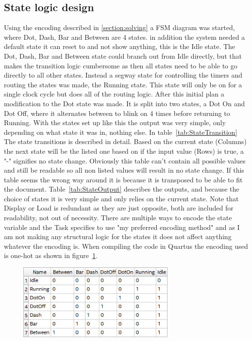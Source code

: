 \documentclass{article}
\begin{document}
\subsection{State logic design}\label{section:FSM}
 Using the encoding described in \ref{section:solving} a FSM diagram was started, where Dot, Dash, Bar and Between are 4 states. in addition the system needed a default state it can reset to and not show anything, this is the Idle state. The Dot, Dash, Bar and Between state could branch out from Idle directly, but that makes the transition logic cumbersome as then all states need to be able to go directly to all other states. Instead a segway state for controlling the timers and routing the states was made, the Running state. This state will only be on for a single clock cycle but does all of the routing logic. After this initial plan a modification to the Dot state was made. It is split into two states, a Dot On and Dot Off, where it alternates between to blink on 4 times before returning to Running. With the states set up like this the output was very simple, only depending on what state it was in, nothing else. In table~\ref{tab:StateTransition} The state transitions is described in detail. Based on the current state (Columns) the next state will be the listed one based on if the input value (Rows) is true, a "-" signifies no state change. Obviously this table can't contain all possible values and still be readable so all non listed values will result in no state change. If this table seems the wrong way around it is because it is transposed to be able to fit the document. Table~\ref{tab:StateOutput} describes the outputs, and because the choice of states it is very simple and only relies on the current state. Note that Display or Load is redundant as they are just opposite, both are included for readability, not out of necessity. There are multiple ways to encode the state variable and the Task specifies to use "my preferred encoding method" and as I am not making any structural logic for the states it does not affect anything whatever the encoding is. When compiling the code in Quartus the encoding used is one-hot as shown in figure~\ref{fig:StateEncoding}.
\hspace{3cm}
\begin{figure}[h]
    \centering
    \includegraphics[width=0.7\textwidth]{Figures/State encoding.jpg}
    \label{fig:StateEncoding}
\end{figure}
\end{document}

